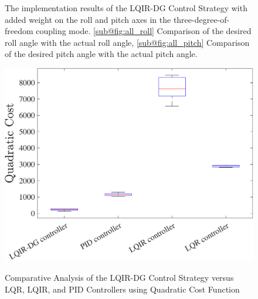 \documentclass[3p,times]{elsarticle}
\begin{document}
\begin{figure}[H]
	\centering
	\caption{The implementation results of the LQIR-DG Control Strategy with added weight on the roll and pitch axes in the three-degree-of-freedom coupling mode. \ref{sub@fig:all_roll} Comparison of the desired roll angle with the actual roll angle, \ref{sub@fig:all_pitch} Comparison of the desired pitch angle with the actual pitch angle.}
	\label{fig:compare}
\end{figure}

\begin{figure}[H]
	\centering
	{\includegraphics[width=.49\linewidth]{../Figure/implementation/box_plot/lqidgvsboxplot}
	}
	\caption{Comparative Analysis of the LQIR-DG Control Strategy versus LQR, LQIR, and PID Controllers using Quadratic Cost Function}
	\label{fig:compare_boxplot}
\end{figure}
\end{document}
